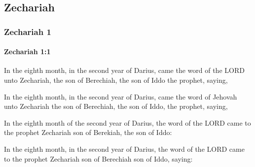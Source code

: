 \subsection{Zechariah}
	\label{ZECHARIAH}

	\subsubsection{Zechariah 1} %
		\label{ZECHARIAH-1}

		\paragraph{Zechariah 1:1} %
			\label{ZECHARIAH-1-1}

			In the eighth month, in the second year of Darius, came the word of the LORD unto Zechariah, the son of Berechiah, the son of Iddo the prophet, saying,

			\begin{versebox}
					\item[BHS] 
					\item[LXX] 
					\item[ASV] In the eighth month, in the second year of Darius, came the word of Jehovah unto Zechariah the son of Berechiah, the son of Iddo, the prophet, saying,
					\item[NIV] In the eighth month of the second year of Darius, the word of the LORD came to the prophet Zechariah son of Berekiah, the son of Iddo:
					\item[NRSV] In the eighth month, in the second year of Darius, the word of the LORD came to the prophet Zechariah son of Berechiah son of Iddo, saying:
			\end{versebox}


